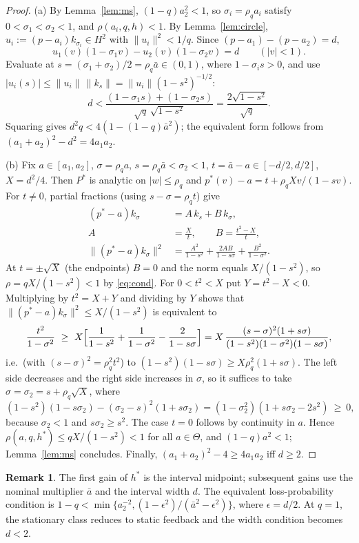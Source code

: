 \documentclass[preprint,12pt,numbers]{elsarticle}
\theoremstyle{definition}
\newtheorem{remark}{Remark}
\newcommand{\abar}{\bar a}
\begin{document}
\begin{proof}
(a) By Lemma~\ref{lem:ms}, $(1-q)a_2^2<1$, so $\sigma_i=\rho_qa_i$ satisfy $0<\sigma_1<\sigma_2<1$, and $\rho(a_i,q,h)<1$. By Lemma~\ref{lem:circle}, $u_i:=(p-a_i)k_{\sigma_i}\in H^2$ with $\|u_i\|^2<1/q$. Since $(p-a_1)-(p-a_2)=d$,
\[
u_1(v)(1-\sigma_1v)-u_2(v)(1-\sigma_2v)=d\qquad(|v|<1).
\]
Evaluate at $s=(\sigma_1+\sigma_2)/2=\rho_q\abar\in(0,1)$, where $1-\sigma_is>0$, and use $|u_i(s)|\le\|u_i\|\,\|k_s\|=\|u_i\|(1-s^2)^{-1/2}$:
\[
d<\frac{(1-\sigma_1s)+(1-\sigma_2s)}{\sqrt q\,\sqrt{1-s^2}}=\frac{2\sqrt{1-s^2}}{\sqrt q}.
\]
Squaring gives $d^2q<4(1-(1-q)\abar^2)$; the equivalent form follows from $(a_1+a_2)^2-d^2=4a_1a_2$.

(b) Fix $a\in[a_1,a_2]$, $\sigma=\rho_qa$, $s=\rho_q\abar<\sigma_2<1$, $t=\abar-a\in[-d/2,d/2]$, $X=d^2/4$. Then $P^*$ is analytic on $|w|\le\rho_q$ and $p^*(v)-a=t+\rho_qXv/(1-sv)$. For $t\neq0$, partial fractions (using $s-\sigma=\rho_qt$) give
\[
\begin{aligned}
(p^*-a)k_\sigma &= A\,k_s+B\,k_\sigma, \\[-1mm]
A&=\frac Xt,\qquad B=\frac{t^2-X}{t},\\
\|(p^*-a)k_\sigma\|^2
&=\frac{A^2}{1-s^2}+\frac{2AB}{1-s\sigma}+\frac{B^2}{1-\sigma^2}.
\end{aligned}
\]
At $t=\pm\sqrt X$ (the endpoints) $B=0$ and the norm equals $X/(1-s^2)$, so $\rho=qX/(1-s^2)<1$ by \eqref{eq:cond}. For $0<t^2<X$ put $Y=t^2-X<0$. Multiplying by $t^2=X+Y$ and dividing by $Y$ shows that $\|(p^*-a)k_\sigma\|^2\le X/(1-s^2)$ is equivalent to
\[
\frac{t^2}{1-\sigma^2}\ \ge\ X\Bigl[\frac1{1-s^2}+\frac1{1-\sigma^2}-\frac2{1-s\sigma}\Bigr]=X\,\frac{(s-\sigma)^2(1+s\sigma)}{(1-s^2)(1-\sigma^2)(1-s\sigma)},
\]
i.e.\ (with $(s-\sigma)^2=\rho_q^2t^2$) to $(1-s^2)(1-s\sigma)\ge X\rho_q^2(1+s\sigma)$. The left side decreases and the right side increases in $\sigma$, so it suffices to take $\sigma=\sigma_2=s+\rho_q\sqrt X$, where
\[
(1-s^2)(1-s\sigma_2)-(\sigma_2-s)^2(1+s\sigma_2)=(1-\sigma_2^2)(1+s\sigma_2-2s^2)\ \ge\ 0,
\]
because $\sigma_2<1$ and $s\sigma_2\ge s^2$. The case $t=0$ follows by continuity in $a$. Hence $\rho(a,q,h^*)\le qX/(1-s^2)<1$ for all $a\in\Theta$, and $(1-q)a^2<1$; Lemma~\ref{lem:ms} concludes. Finally, $(a_1+a_2)^2-4\ge4a_1a_2$ iff $d\ge2$.
\end{proof}

\begin{remark}
The first gain of $h^*$ is the interval midpoint; subsequent gains use the nominal multiplier $\bar a$ and the interval width $d$. The equivalent loss-probability condition is $1-q<\min\{a_2^{-2},(1-\epsilon^2)/(\bar a^2-\epsilon^2)\}$, where $\epsilon=d/2$. At $q=1$, the stationary class reduces to static feedback and the width condition becomes $d<2$.
\end{remark}
\end{document}
